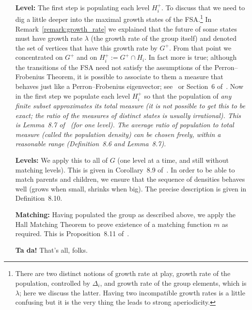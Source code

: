 \documentclass[12pt,reqno]{amsart}
\theoremstyle{plain}
\theoremstyle{definition}
\numberwithin{subcase}{case}
\theoremstyle{plain}
\theoremstyle{definition}
\begin{document}
\begin{enumerate}
\item[\bf Level:] The first step is populating each level \(H^{+}_{i}\). To discuss that we need to dig a little deeper into the maximal growth states of the FSA.\footnote{ 
There are two distinct notions of growth rate at play, growth rate of the population, controlled by \(\Delta_{i}\), and growth rate of the group elements, which is \(\lambda\); here we discuss the latter. Having two incompatible growth rates is a little confusing but it is the very thing the leads to strong aperiodicity.}
In Remark~\ref{remark:growth_rate} we explained that the future of some states must have growth rate \(\lambda\) (the growth rate of the group itself) and denoted the set of vertices that have this growth rate by \(G^{+}\). From that point we concentrated on \(G^{+}\) and on \(H^{+}_{i} := G^{+} \cap H_{i}\). In fact more is true; although the transitions of the FSA need not satisfy the assumptions of the Perron--Frobenius Theorem, it is possible to associate to them a measure that behaves just like a Perron--Frobenius eigenvector; see~\cite{MR4015648} or Section~6 of~\cite{cohen_goodman-strauss_rieck_2021}. Now in the first step we populate each level \(H^{+}_{i}\) so that the population of \em any \em finite subset approximates its total measure (it is not possible to get this to be exact; the ratio of the measures of distinct states is usually irrational). This is Lemma~8.7 of~\cite{cohen_goodman-strauss_rieck_2021} (for one level). The average ratio of population to total measure (called the population density) can be chosen freely, within a reasonable range (Definition~8.6 and Lemma~8.7).

\item[\bf Levels:] We apply this to all of \(G\) (one level at a time, and still without matching levels). This is given in Corollary~8.9 of~\cite{cohen_goodman-strauss_rieck_2021}. In order to be able to match parents and children, we ensure that the sequence of densities behaves well (grows when small, shrinks when big). The precise description is given in Definition~8.10.

\item[\bf Matching:] Having populated the group as described above, we apply the Hall Matching Theorem to prove existence of a matching function \(m\) as required.  This is Proposition~8.11 of~\cite{cohen_goodman-strauss_rieck_2021}.

\item[\bf Ta da!] That's all, folks.

\end{enumerate}
\end{document}
